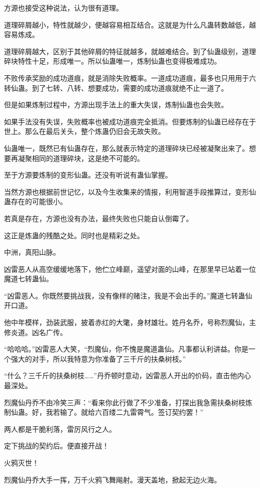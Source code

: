 \begin{this_body}
方源也接受这种说法，认为很有道理。

道理碎屑越小，特性就越少，便越容易相互结合。这就是为什么凡蛊转数越低，越容易炼成。

道理碎屑越大，区别于其他碎屑的特征就越多，就越难结合。到了仙蛊级别，道理碎块特性十足，形成唯一。所以仙蛊唯一，炼制仙蛊也变得极难成功。

不败传承奖励的成功道痕，就是消除失败概率。一道成功道痕，最多也只用用于六转仙蛊。到了七转、八转、想要成功，需要的成功道痕就绝不止一道了。

但是如果炼制过程中，方源出现手法上的重大失误，炼制仙蛊也会失败。

如果手法没有失误，失败概率也被成功道痕完全抵消。但要炼制的仙蛊已经存在于世上。那么在最后关头，整个炼蛊仍旧会无故失败。

仙蛊唯一，既然已有仙蛊存在，那么就表示特定的道理碎块已经被凝聚出来了。想要再凝聚相同的道理碎块，这是绝不可能的。

至于方源要炼制的变形仙蛊。还没有听说有蛊仙掌握。

当然方源也根据前世记忆，以及今生收集来的情报，利用智道手段推算过，变形仙蛊存在的可能很小。

若真是存在，方源也没有办法，最终失败也只能自认倒霉了。

这正是炼蛊的残酷之处。同时也是精彩之处。

中洲，真阳山脉。

凶雷恶人从高空缓缓地落下，他伫立峰巅，遥望对面的山峰，在那里早已站着一位魔道七转蛊仙。

“凶雷恶人。你既然要挑战我，没有像样的赌注，我是不会出手的。”魔道七转蛊仙开口道。

他中年模样，劲装武服，披着赤红的大氅，身材雄壮。姓丹名乔，号称烈魔仙，主修炎道。凶名广传。

“哈哈哈。”凶雷恶人大笑，“烈魔仙，你不愧是魔道蛊仙。凡事都认利讲益。你是一个强大的对手，所以我特意为你准备了三千斤的扶桑树枝。”

“什么？三千斤的扶桑树枝……”丹乔顿时意动，凶雷恶人开出的价码，直击他内心最深处。

烈魔仙丹乔不由冷笑三声：“看来你此行做了不少准备，打探出我急需扶桑树枝炼制仙蛊。好，我若输了。就给六百缕二九雷霄气。签订契约罢！”

两人都是干脆利落，雷厉风行之人。

定下挑战的契约后。便直接开战！

火鸦灭世！

烈魔仙丹乔大手一挥，万千火鸦飞舞飚射。漫天盖地，掀起无边火海。


\end{this_body}
